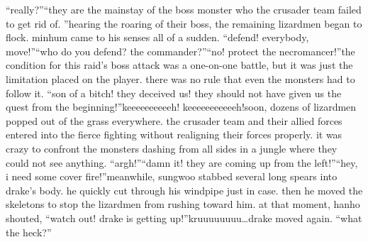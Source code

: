 “really?”“they are the mainstay of the boss monster who the crusader team failed to get rid of.
”hearing the roaring of their boss, the remaining lizardmen began to flock.
minhum came to his senses all of a sudden.
“defend! everybody, move!”“who do you defend? the commander?”“no! protect the necromancer!”the condition for this raid’s boss attack was a one-on-one battle, but it was just the limitation placed on the player.
 there was no rule that even the monsters had to follow it.
“son of a bitch! they deceived us! they should not have given us the quest from the beginning!”keeeeeeeeeeh! keeeeeeeeeeeh!soon, dozens of lizardmen popped out of the grass everywhere.
 the crusader team and their allied forces entered into the fierce fighting without realigning their forces properly.
it was crazy to confront the monsters dashing from all sides in a jungle where they could not see anything.
“argh!”“damn it! they are coming up from the left!”“hey, i need some cover fire!”meanwhile, sungwoo stabbed several long spears into drake’s body.
 he quickly cut through his windpipe just in case.
then he moved the skeletons to stop the lizardmen from rushing toward him.
at that moment, hanho shouted, “watch out! drake is getting up!”kruuuuuuuu…drake moved again.
“what the heck?”

 